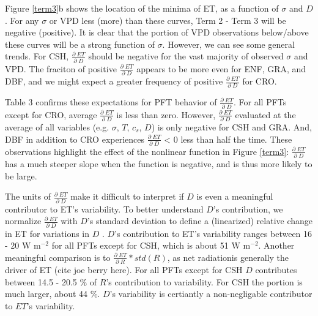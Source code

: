 \documentclass[draft,linenumbers]{agujournal}
\begin{document}
Figure \ref{term3}b shows the location of the minima of ET, as a function of $\sigma$ and $D$. For any $\sigma$ or VPD less (more) than these curves, Term 2 - Term 3 will be negative (positive). It is clear that the portion of VPD observations below/above these curves will be a strong function of $\sigma$. However, we can see some general trends. For CSH, $\frac{\partial \; ET}{\partial \; D}$ should be negative for the vast majority of observed $\sigma$ and VPD. The fraciton of positive $\frac{\partial \; ET}{\partial \; D}$ appears to be more even for ENF, GRA, and DBF, and we might expect a greater frequency of positive $\frac{\partial \; ET}{\partial \; D}$ for CRO. 

Table 3 confirms these expectations for PFT behavior of $\frac{\partial \; ET}{\partial \; D}$. For all PFTs except for CRO, average $\frac{\partial \; ET}{\partial \; D}$ is less than zero. However, $\frac{\partial \; ET}{\partial \; D}$ evaluated at the average of all variables (e.g. $\sigma$, $T$, $c_s$, $D$) is only negative for CSH and GRA. And, DBF in addition to CRO experiences $\frac{\partial \; ET}{\partial \; D}$ < 0 less than half the time. These observations highlight the effect of the nonlinear function in Figure \ref{term3}: $\frac{\partial \; ET}{\partial \; D}$ has a much steeper slope when the function is negative, and is thus more likely to be large.

The units of $\frac{\partial \; ET}{\partial \; D}$ make it difficult to interpret if $D$ is even a meaningful contributor to ET's variability. To better understand $D$'s contribution, we normalize $\frac{\partial \; ET}{\partial \; D}$ with $D$'s standard deviation to define a (linearized) relative change in ET for variations in $D$ . $D$'s contribution to ET's variability ranges between 16 - 20 W m$^{-2}$ for all PFTs except for CSH, which is about 51 W m$^{-2}$. Another meaningful comparison is to $\frac{\partial \; ET}{\partial \; R} * std(R)$, as net radiationis generally the driver of ET (cite joe berry here). For all PFTs except for CSH $D$ contributes between 14.5 - 20.5 \% of $R$'s contribution to variability. For CSH the portion is much larger, about 44 \%. $D$'s variability is certiantly a non-negligable contributor to $ET$'s variability.
\end{document}
